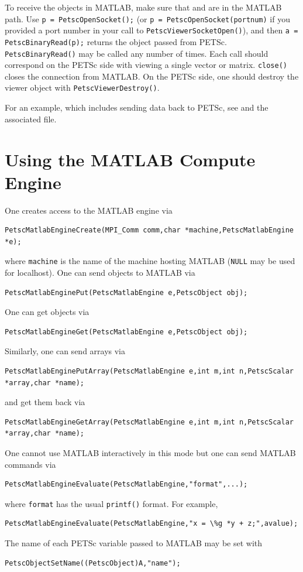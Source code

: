 To receive the objects in MATLAB, make sure that  and 
are in the MATLAB path. Use \break\lstinline{p = PetscOpenSocket();} (or \lstinline{p = PetscOpenSocket(portnum)} if you provided a port number in
your call to \lstinline{PetscViewerSocketOpen()}), and then \lstinline{a = PetscBinaryRead(p);} returns the object passed from PETSc.
\lstinline{PetscBinaryRead()} may be called any number of times. Each call should correspond on the PETSc side with
viewing a single vector or matrix. \lstinline{close()} closes the connection from MATLAB.
On the PETSc side, one should destroy the viewer object with \lstinline{PetscViewerDestroy()}. 

For an example, which includes sending data back to PETSc, see \href{http://www.mcs.anl.gov/petsc/petsc-current/src/vec/vec/examples/tutorials/ex42.c.html}{} and the associated  file.

\section{Using the MATLAB Compute Engine}
\label{sec_matlabengine}

One creates access to the MATLAB engine via
\begin{lstlisting}
PetscMatlabEngineCreate(MPI_Comm comm,char *machine,PetscMatlabEngine *e);
\end{lstlisting}
where \lstinline{machine} is the name of the machine hosting MATLAB (\lstinline{NULL} may be used for localhost).
One can send objects to MATLAB via
\begin{lstlisting}
PetscMatlabEnginePut(PetscMatlabEngine e,PetscObject obj);
\end{lstlisting}
One can get objects
via
\begin{lstlisting}
PetscMatlabEngineGet(PetscMatlabEngine e,PetscObject obj); 
\end{lstlisting}
Similarly, one can send arrays via
\begin{lstlisting}
PetscMatlabEnginePutArray(PetscMatlabEngine e,int m,int n,PetscScalar *array,char *name);
\end{lstlisting}
and get them back via
\begin{lstlisting}
PetscMatlabEngineGetArray(PetscMatlabEngine e,int m,int n,PetscScalar *array,char *name);
\end{lstlisting}
One cannot use MATLAB
interactively in this mode but one can send MATLAB commands via
\begin{lstlisting}
PetscMatlabEngineEvaluate(PetscMatlabEngine,"format",...);
\end{lstlisting}
where \lstinline{format} has the usual \lstinline{printf()} format.
For example,
\begin{lstlisting}
PetscMatlabEngineEvaluate(PetscMatlabEngine,"x = \%g *y + z;",avalue);
\end{lstlisting}
The name of each PETSc variable passed to MATLAB may be set with
\begin{lstlisting}
PetscObjectSetName((PetscObject)A,"name");
\end{lstlisting}

